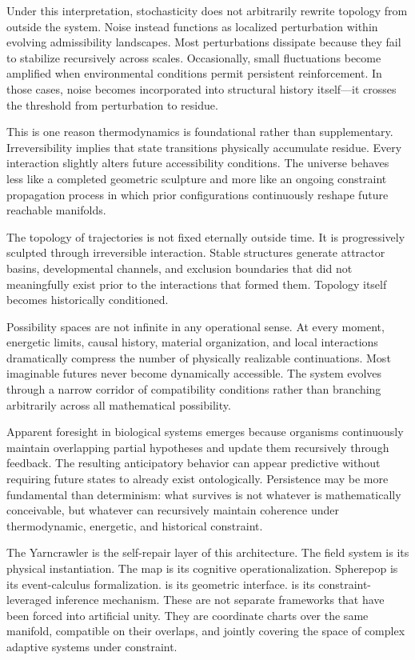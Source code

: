 \claimC Under this interpretation, stochasticity does not arbitrarily rewrite
topology from outside the system. Noise instead functions as localized
perturbation within evolving admissibility landscapes. Most perturbations
dissipate because they fail to stabilize recursively across scales. Occasionally,
small fluctuations become amplified when environmental conditions permit persistent
reinforcement. In those cases, noise becomes incorporated into structural history
itself---it crosses the threshold from perturbation to residue.

This is one reason thermodynamics is foundational rather than supplementary.
Irreversibility implies that state transitions physically accumulate residue.
Every interaction slightly alters future accessibility conditions. The universe
behaves less like a completed geometric sculpture and more like an ongoing
constraint propagation process in which prior configurations continuously reshape
future reachable manifolds.

The topology of trajectories is not fixed eternally outside time. It is
progressively sculpted through irreversible interaction. Stable structures
generate attractor basins, developmental channels, and exclusion boundaries
that did not meaningfully exist prior to the interactions that formed them.
Topology itself becomes historically conditioned.

\claimC Possibility spaces are not infinite in any operational sense. At every
moment, energetic limits, causal history, material organization, and local
interactions dramatically compress the number of physically realizable
continuations. Most imaginable futures never become dynamically accessible.
The system evolves through a narrow corridor of compatibility conditions rather
than branching arbitrarily across all mathematical possibility.

Apparent foresight in biological systems emerges because organisms continuously
maintain overlapping partial hypotheses and update them recursively through
feedback. The resulting anticipatory behavior can appear predictive without
requiring future states to already exist ontologically. Persistence may be
more fundamental than determinism: what survives is not whatever is
mathematically conceivable, but whatever can recursively maintain coherence
under thermodynamic, energetic, and historical constraint.

The Yarncrawler is the self-repair layer of this architecture. The \RSVP field
system is its physical instantiation. The \KES map is its cognitive operationalization.
Spherepop is its event-calculus formalization. \TARTAN is its geometric interface.
\CLIO is its constraint-leveraged inference mechanism. These are not separate
frameworks that have been forced into artificial unity. They are coordinate charts
over the same manifold, compatible on their overlaps, and jointly covering the
space of complex adaptive systems under constraint.

